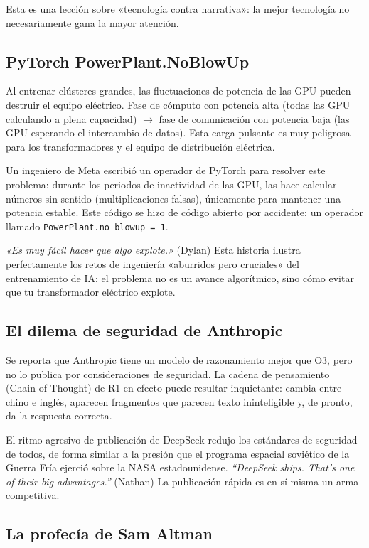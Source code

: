 \documentclass[a4paper]{article}
\begin{document}
Esta es una lección sobre «tecnología contra narrativa»: la mejor tecnología no necesariamente gana la mayor atención.

\subsection{PyTorch PowerPlant.NoBlowUp}

Al entrenar clústeres grandes, las fluctuaciones de potencia de las GPU pueden destruir el equipo eléctrico. Fase de cómputo con potencia alta (todas las GPU calculando a plena capacidad) $\to$ fase de comunicación con potencia baja (las GPU esperando el intercambio de datos). Esta carga pulsante es muy peligrosa para los transformadores y el equipo de distribución eléctrica.

Un ingeniero de Meta escribió un operador de PyTorch para resolver este problema: durante los periodos de inactividad de las GPU, las hace calcular números sin sentido (multiplicaciones falsas), únicamente para mantener una potencia estable. Este código se hizo de código abierto por accidente: un operador llamado \texttt{PowerPlant.no\_blowup = 1}.

\textit{«Es muy fácil hacer que algo explote.»} (Dylan) Esta historia ilustra perfectamente los retos de ingeniería «aburridos pero cruciales» del entrenamiento de IA: el problema no es un avance algorítmico, sino cómo evitar que tu transformador eléctrico explote.

\subsection{El dilema de seguridad de Anthropic}

Se reporta que Anthropic tiene un modelo de razonamiento mejor que O3, pero no lo publica por consideraciones de seguridad. La cadena de pensamiento (Chain-of-Thought) de R1 en efecto puede resultar inquietante: cambia entre chino e inglés, aparecen fragmentos que parecen texto ininteligible y, de pronto, da la respuesta correcta.

El ritmo agresivo de publicación de DeepSeek redujo los estándares de seguridad de todos, de forma similar a la presión que el programa espacial soviético de la Guerra Fría ejerció sobre la NASA estadounidense. \textit{``DeepSeek ships. That's one of their big advantages.''} (Nathan) La publicación rápida es en sí misma un arma competitiva.

\subsection{La profecía de Sam Altman}
\end{document}
